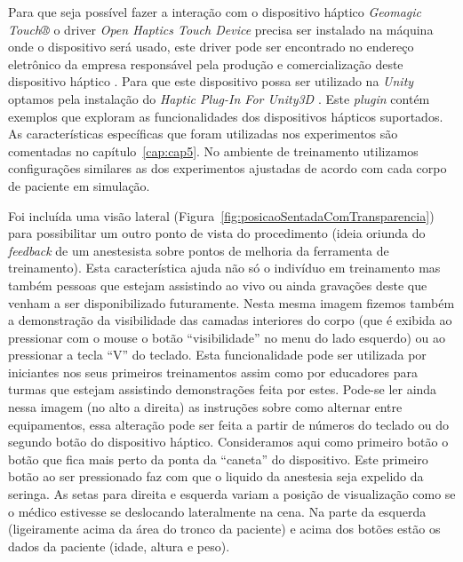 Para que seja possível fazer a interação com o dispositivo háptico \textit{Geomagic Touch®} o driver \textit{Open Haptics Touch Device} precisa ser instalado na máquina onde o dispositivo será usado, este driver pode ser encontrado no endereço eletrônico da empresa responsável pela produção e comercialização deste dispositivo háptico \cite{3DSystemsTouch2018}. Para que este dispositivo possa ser utilizado na \textit{Unity} optamos pela instalação do \textit{Haptic Plug-In For Unity3D} \cite{Poyade2014}. Este \textit{plugin} contém exemplos que exploram as funcionalidades dos dispositivos hápticos suportados. As características específicas que foram utilizadas nos experimentos são comentadas no capítulo~\ref{cap:cap5}. No ambiente de treinamento utilizamos configurações similares as dos experimentos ajustadas de acordo com cada corpo de paciente em simulação. 

Foi incluída uma visão lateral (Figura~\ref{fig:posicaoSentadaComTransparencia}) para possibilitar um outro ponto de vista do procedimento (ideia oriunda do \textit{feedback} de um anestesista sobre pontos de melhoria da ferramenta de treinamento). Esta característica ajuda não só o indivíduo em treinamento mas também pessoas que estejam assistindo ao vivo ou ainda gravações deste que venham a ser disponibilizado futuramente. Nesta mesma imagem fizemos também a demonstração da visibilidade das camadas interiores do corpo (que é exibida ao pressionar com o mouse o botão ``visibilidade'' no menu do lado esquerdo) ou ao pressionar a tecla ``V'' do teclado. Esta funcionalidade pode ser utilizada por iniciantes nos seus primeiros treinamentos assim como por educadores para turmas que estejam assistindo demonstrações feita por estes. Pode-se ler ainda nessa imagem (no alto a direita) as instruções sobre como alternar entre equipamentos, essa alteração pode ser feita a partir de números do teclado ou do segundo botão do dispositivo háptico. Consideramos aqui como primeiro botão o botão que fica mais perto da ponta da ``caneta'' do dispositivo. Este primeiro botão ao ser pressionado faz com que o liquido da anestesia seja expelido da seringa. As setas para direita e esquerda variam a posição de visualização como se o médico estivesse se deslocando lateralmente na cena. Na parte da esquerda (ligeiramente acima da área do tronco da paciente) e acima dos botões estão os dados da paciente (idade, altura e peso). 

